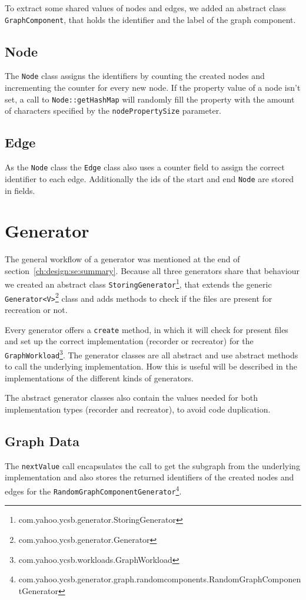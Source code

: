To extract some shared values of nodes and edges,
we added an abstract class \texttt{GraphComponent},
that holds the identifier and the label of the graph component.

\subsection{Node}
The \texttt{Node} class assigns the identifiers by counting the created nodes and incrementing the counter for every new node.
If the property value of a node isn't set,
a call to \texttt{Node::getHashMap} will randomly fill the property with the amount of characters specified by the \texttt{nodePropertySize} parameter.

\subsection{Edge}
As the \texttt{Node} class the \texttt{Edge} class also uses a counter field to assign the correct identifier to each edge.
Additionally the ids of the start and end \texttt{Node} are stored in fields.

\section{Generator}
\label{ch:implementation:se:generator}
The general workflow of a generator was mentioned at the end of section~\ref{ch:design:se:summary}.
Because all three generators share that behaviour we created an abstract class \texttt{StoringGenerator}\footnote{com.yahoo.ycsb.generator.StoringGenerator},
that extends the generic \texttt{Generator<V>}\footnote{com.yahoo.ycsb.generator.Generator} class and adds methods to check if the files are present for recreation or not.

Every generator offers a \texttt{create} method,
in which it will check for present files and set up the correct implementation (recorder or recreator) for the \texttt{GraphWorkload}\footnote{com.yahoo.ycsb.workloads.GraphWorkload}.
The generator classes are all abstract and use abstract methods to call the underlying implementation.
How this is useful will be described in the implementations of the different kinds of generators.

The abstract generator classes also contain the values needed for both implementation types (recorder and recreator),
to avoid code duplication.

\subsection{Graph Data}
The \texttt{nextValue} call encapsulates the call to get the subgraph from the underlying implementation and also stores the returned identifiers of the created nodes and edges for the \texttt{RandomGraphComponentGenerator}\footnote{com.yahoo.ycsb.generator.graph.randomcomponents.RandomGraphComponentGenerator}.

